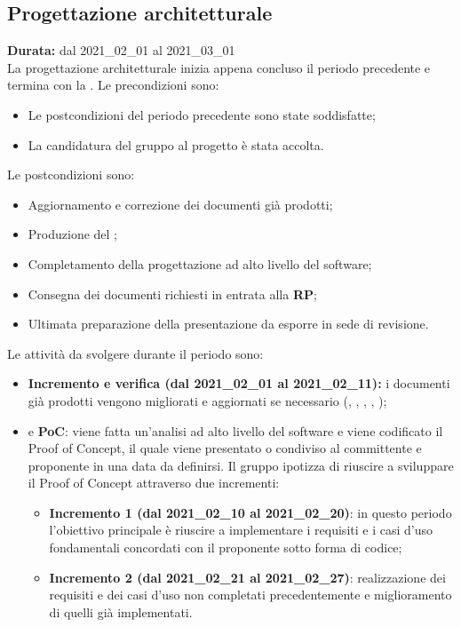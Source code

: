 \subsection{Progettazione architetturale}
\label{progettazione_architetturale}
\textbf{Durata:} dal 2021\_02\_01 al 2021\_03\_01\\
La progettazione architetturale inizia appena concluso il periodo precedente e termina con la .
Le precondizioni sono:
\begin{itemize}
    \item Le postcondizioni del periodo precedente sono state soddisfatte;
    \item La candidatura del gruppo al progetto {\NomeProgetto} è stata accolta.
\end{itemize}
Le postcondizioni sono:
\begin{itemize}
    \item Aggiornamento e correzione dei documenti già prodotti;
    \item Produzione del ;
    \item Completamento della progettazione ad alto livello del software;
    \item Consegna dei documenti richiesti in entrata alla \textbf{RP};
    \item Ultimata preparazione della presentazione da esporre in sede di revisione.
\end{itemize}
Le attività da svolgere durante il periodo sono:
\begin{itemize}
    \item \textbf{Incremento e verifica (dal 2021\_02\_01 al 2021\_02\_11):} i documenti già prodotti vengono migliorati e aggiornati se necessario ({\NdP}, {\PdP}, {\Glossario}, {\PdQ}, {\AdR});
    \item {} e \textbf{PoC}: viene fatta un'analisi ad alto livello del software e viene codificato il Proof of Concept, il quale viene presentato o condiviso al committente e proponente in una data da definirsi. Il gruppo ipotizza di riuscire a sviluppare il Proof of Concept attraverso due incrementi:
    \begin{itemize}
    	\item \textbf{Incremento 1 (dal 2021\_02\_10 al 2021\_02\_20)}: in questo periodo l'obiettivo principale è riuscire a implementare i requisiti e i casi d'uso fondamentali concordati con il proponente sotto forma di codice;
        \item \textbf{Incremento 2 (dal 2021\_02\_21 al 2021\_02\_27)}: realizzazione dei requisiti e dei casi d'uso non completati precedentemente e miglioramento di quelli già implementati.
    \end{itemize}
\end{itemize}
